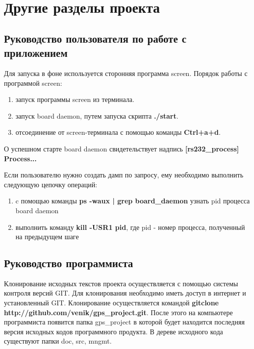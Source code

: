 \section{Другие разделы проекта}


\subsection{Руководство пользователя по работе с приложением}

Для запуска в фоне используется сторонняя программа screen. Порядок работы с программой screen:

\begin{enumerate}
\renewcommand{\labelenumi}{\arabic{enumi}.}
\item запуск программы screen из терминала.
\item запуск board daemon, путем запуска скрипта \textbf{./start}.
\item отсоединение от screen-терминала с помощью команды \textbf{Ctrl+a+d}.
\end{enumerate}
О успешном старте board daemon свидетельствует надпись \textbf{[rs232\_process] Process...}

Если пользователю нужно создать дамп по запросу, ему необходимо выполнить следующую цепочку операций:
\begin{enumerate}
\renewcommand{\labelenumi}{\arabic{enumi}.}
\item c помощью команды \textbf{ps -waux | grep board\_daemon} узнать pid процесса board daemon
\item выполнить команду \textbf{kill -USR1 pid}, где pid - номер процесса, полученный на предыдущем шаге 
\end{enumerate}



\subsection{Руководство программиста}
Клонирование исходных текстов проекта осуществляется с помощью системы контроля версий GIT.  Для клонирования
необходимо иметь доступ в интернет и установленный GIT. Клонирование осуществляется командой \textbf{gitclone http://github.com/venik/gps\_project.git}.
После этого на компьютере программиста появится папка gps\_project в которой будет находится последняя версия исходных кодов программного продукта.
В дереве исходного кода существуют папки doc, src, mngmt. 


